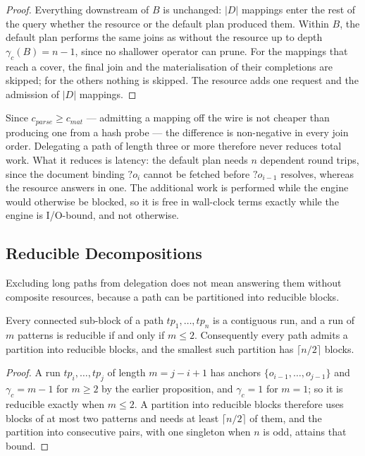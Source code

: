 \begin{proof}
Everything downstream of $B$ is unchanged: $|D|$ mappings enter the rest of the query
whether the resource or the default plan produced them. Within $B$, the default plan
performs the same joins as without the resource up to depth $\gamma_c(B) = n-1$, since no
shallower operator can prune. For the mappings that reach a cover, the final join and the
materialisation of their completions are skipped; for the others nothing is skipped. The
resource adds one request and the admission of $|D|$ mappings.
\end{proof}

Since $c_{\mathit{parse}} \geq c_{\mathit{mat}}$ --- admitting a mapping off the wire is
not cheaper than producing one from a hash probe --- the difference is non-negative in
every join order. Delegating a path of length three or more therefore never reduces total
work. What it reduces is latency: the default plan needs $n$ dependent round trips, since
the document binding $?o_{i}$ cannot be fetched before $?o_{i-1}$ resolves, whereas the
resource answers in one. The additional work is performed while the engine would
otherwise be blocked, so it is free in wall-clock terms exactly while the engine is
I/O-bound, and not otherwise.

\subsection{Reducible Decompositions}

Excluding long paths from delegation does not mean answering them without composite
resources, because a path can be partitioned into reducible blocks.

\begin{proposition}[Tiling]
Every connected sub-block of a path $tp_1, \dots, tp_n$ is a contiguous run, and a run of
$m$ patterns is reducible if and only if $m \leq 2$. Consequently every path admits a
partition into reducible blocks, and the smallest such partition has $\lceil n/2 \rceil$
blocks.
\end{proposition}

\begin{proof}
A run $tp_i, \dots, tp_j$ of length $m = j - i + 1$ has anchors
$\{o_{i-1}, \dots, o_{j-1}\}$ and $\gamma_c = m - 1$ for $m \geq 2$ by the earlier
proposition, and $\gamma_c = 1$ for $m = 1$; so it is reducible exactly when $m \leq 2$.
A partition into reducible blocks therefore uses blocks of at most two patterns and needs
at least $\lceil n/2 \rceil$ of them, and the partition into consecutive pairs, with one
singleton when $n$ is odd, attains that bound.
\end{proof}

